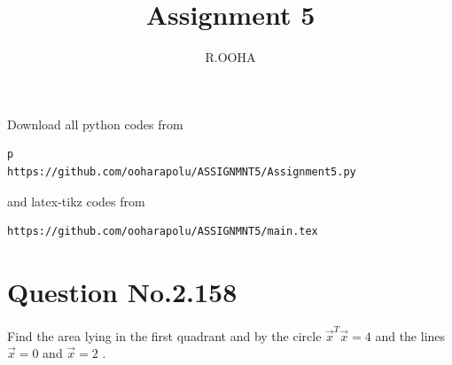 \documentclass[journal,12pt,twocolumn]{IEEEtran}
\begin{document}
     \def\rightbox#1{\makebox[0in][r]{#1}}
     \def\centbox#1{\makebox[0in]{#1}}
     \def\topbox#1{\raisebox{-\baselineskip}[0in][0in]{#1}}
     \def\midbox#1{\raisebox{-0.5\baselineskip}[0in][0in]{#1}}
\vspace{3cm}
\title{Assignment 5}
\author{R.OOHA}
\maketitle
\newpage
\bigskip
\renewcommand{\thefigure}{\theenumi}
\renewcommand{\thetable}{\theenumi}
Download all python codes from 
\begin{lstlisting}p
https://github.com/ooharapolu/ASSIGNMNT5/Assignment5.py
\end{lstlisting}
%
and latex-tikz codes from 
%
\begin{lstlisting}
https://github.com/ooharapolu/ASSIGNMNT5/main.tex
\end{lstlisting}
%
\section{Question No.2.158}
Find the area lying in the first quadrant and by the circle $\vec{x}^T\vec{x}=4$ and the lines $\vec{x}=0$ and $\vec{x}=2$ .
%
\end{document}
